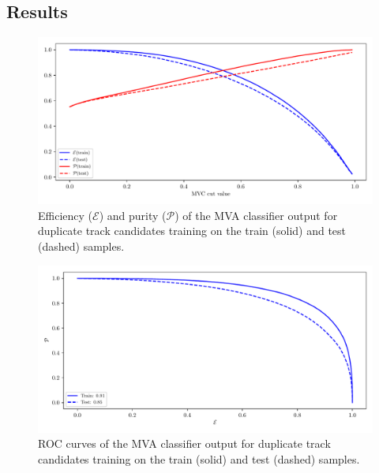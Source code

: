 \subsection{Results}

\begin{figure}[H]
\centering
\captionsetup{width=0.8\linewidth}
\includegraphics[width=\linewidth]{fig/addendums/curl_effpur}
\caption{Efficiency ($\mathcal{E}$) and purity ($\mathcal{P}$) of the MVA classifier output for duplicate track candidates training on the train (solid) and test (dashed) samples.}
\end{figure}

\begin{figure}[H]
\centering
\captionsetup{width=0.8\linewidth}
\includegraphics[width=\linewidth]{fig/addendums/curl_roc}
\caption{ROC curves of the MVA classifier output for duplicate track candidates training on the train (solid) and test (dashed) samples.}
\end{figure}
